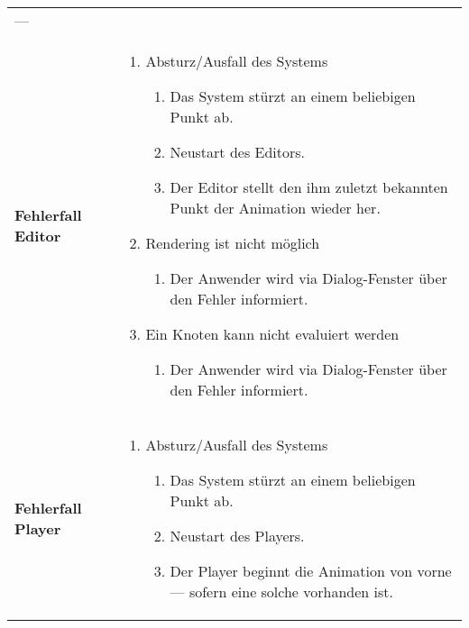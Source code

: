 \begin{longtabu}{p{0.5\textwidth}p{0.5\textwidth}}
        ---\\
    \cmidrule(r){1-1}\cmidrule(lr){2-2}
        \textbf{Fehlerfall Editor} &
        \begin{enumerate}[label= (\alph*)]
            \item{Absturz/Ausfall des Systems
                \begin{enumerate}[label= (\roman*)]
                        \item{Das System stürzt an einem beliebigen Punkt
                                ab.}
                        \item{Neustart des Editors.}
                        \item{Der Editor stellt den ihm zuletzt bekannten
                                Punkt der Animation wieder her.}
                \end{enumerate}
            }
            \item{Rendering ist nicht möglich
                \begin{enumerate}[label= (\roman*)]
                    \item{Der Anwender wird via Dialog-Fenster über den Fehler
                            informiert.}
                \end{enumerate}
            }
            \item{Ein Knoten kann nicht evaluiert werden
                \begin{enumerate}[label= (\roman*)]
                    \item{Der Anwender wird via Dialog-Fenster über den Fehler
                            informiert.}
                \end{enumerate}
            }
        \end{enumerate} \\
    \cmidrule(r){1-1}\cmidrule(lr){2-2}
        \textbf{Fehlerfall Player} &
        \begin{enumerate}[label= (\alph*)]
            \item{Absturz/Ausfall des Systems
                \begin{enumerate}[label= (\roman*)]
                        \item{Das System stürzt an einem beliebigen Punkt
                                ab.}
                        \item{Neustart des Players.}
                        \item{Der Player beginnt die Animation von vorne ---
                                sofern eine solche vorhanden ist.}

\end{enumerate}}
\end{enumerate}
\end{longtabu}
